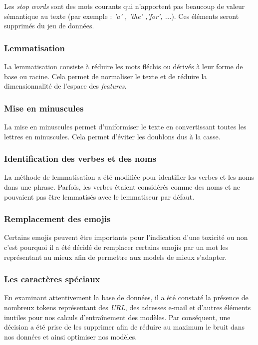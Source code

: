 Les \textit{stop words} sont des mots courants qui n'apportent pas beaucoup de valeur sémantique au texte (par exemple : \textit{'a' , 'the' ,'for', ...}). Ces éléments seront supprimés du jeu de données.

\subsubsection*{Lemmatisation}

La lemmatisation consiste à réduire les mots fléchis ou dérivés à leur forme de base ou racine. Cela permet de normaliser le texte et de réduire la dimensionnalité de l'espace des \textit{features}.
\subsubsection*{Mise en minuscules}

La mise en minuscules permet d'uniformiser le texte en convertissant toutes les lettres en minuscules. Cela permet d'éviter les doublons dus à la casse.

\subsubsection*{Identification des verbes et des noms}

La méthode de lemmatisation a été modifiée pour identifier les verbes et les noms dans une phrase. Parfois, les verbes étaient considérés comme des noms et ne pouvaient pas être lemmatisés avec le lemmatiseur par défaut.


\subsubsection*{Remplacement des emojis}

Certains emojis peuvent être importants pour l'indication d'une toxicité ou non c'est pourquoi il a été décidé de remplacer certains emojis par un mot les représentant au mieux afin de permettre aux models de mieux s'adapter.
\subsubsection*{Les caractères spéciaux}

En examinant attentivement la base de données, il a été constaté la présence de nombreux tokens représentant des \textit{URL}, des adresses e-mail et d’autres éléments inutiles pour nos calculs d’entraînement des modèles. 
Par conséquent, une décision a été prise de les supprimer afin de réduire au maximum le bruit dans nos données et ainsi optimiser nos modèles.

